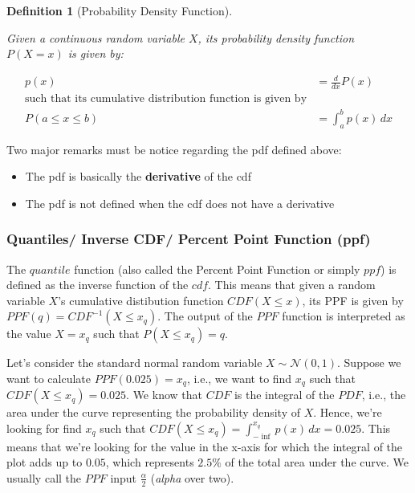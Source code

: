\documentclass{article}
\newtheorem{definition}{Definition}[section]
\begin{document}
\begin{definition}[Probability Density Function]
	\label{def:pdf}
	
	Given a continuous random variable $X$, its probability density function $P(X = x)$ is given by:
	
	\begin{align}
		p(x) &= \frac{d}{dx} P(x) \\
		\text{such that its cumulative distribution function is given by}& \\
		P(a \leq x \leq b) &= \int_{a}^{b} p(x) \, dx
	\end{align}

\end{definition}


Two major remarks must be notice regarding the pdf defined above:

\begin{itemize}
	\item The pdf is basically the \textbf{derivative} of the cdf
	\item The pdf is not defined when the cdf does not have a derivative 
\end{itemize}

\subsubsection{Quantiles/ Inverse CDF/  Percent Point Function (ppf)}

The $quantile$ function (also called the Percent Point Function or simply $ppf$) is defined as the inverse function of the $cdf$. This means that given a random variable $X$'s cumulative distibution function $CDF(X \leq x)$, its PPF is given by $PPF(q) = CDF^{-1}(X \leq x_q)$. The output of the $PPF$ function is interpreted as the value $X = x_q$ such that $P(X \leq x_q) = q$.

Let's consider the standard normal random variable $X \sim \mathcal{N}(0, 1)$. Suppose we want to calculate $PPF(0.025) = x_q$, i.e., we want to find $x_q$ such that $CDF(X \leq x_q) = 0.025$. We know that $CDF$ is the integral of the $PDF$, i.e., the area under the curve representing the probability density of $X$. Hence, we're looking for find $x_q$ such that $CDF(X \leq x_q) = \int_{-\inf}^{x_q} p(x) \, dx = 0.025$. This means that we're looking for the value in the x-axis for which the integral of the plot adds up to $0.05$, which represents $2.5\%$ of the total area under the curve. We usually call the $PPF$ input $\frac{\alpha}{2}$ (\textit{alpha} over two).
\end{document}
